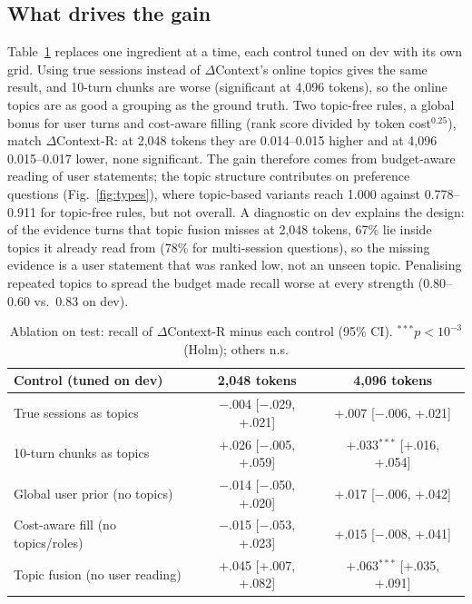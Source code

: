 \documentclass[conference]{IEEEtran}
\newcommand{\dc}{$\Delta$Context}
\newcommand{\dcr}{$\Delta$Context-R}
\begin{document}
\subsection{What drives the gain}
Table~\ref{tab:controls} replaces one ingredient at a time, each control tuned on
dev with its own grid. Using true sessions instead of \dc{}'s online topics gives
the same result, and 10-turn chunks are worse (significant at 4,096 tokens), so
the online topics are as good a grouping as the ground truth. Two topic-free
rules, a global bonus for user turns and cost-aware filling (rank score divided
by token cost$^{0.25}$), match \dcr{}: at 2,048 tokens they are 0.014--0.015
higher and at 4,096 0.015--0.017 lower, none significant. The gain therefore comes from
budget-aware reading of user statements; the topic structure contributes on
preference questions (Fig.~\ref{fig:types}), where topic-based variants reach
1.000 against 0.778--0.911 for topic-free rules, but not overall. A diagnostic
on dev explains the design: of the evidence turns that topic fusion misses at
2,048 tokens, 67\% lie inside topics it already read from (78\% for
multi-session questions), so the missing evidence is a user statement that was
ranked low, not an unseen topic. Penalising repeated topics to spread the
budget made recall worse at every strength (0.80--0.60 vs.\ 0.83 on dev).

\begin{table}[t]
\centering
\caption{Ablation on test: recall of \dcr{} minus each control (95\% CI). $^{***}p<10^{-3}$ (Holm); others n.s.}
\label{tab:controls}
\scriptsize
\setlength{\tabcolsep}{2.5pt}
\begin{tabular}{@{}lcc@{}}
\toprule
Control (tuned on dev) & 2,048 tokens & 4,096 tokens \\
\midrule
True sessions as topics & $-$.004 [$-$.029, +.021] & +.007 [$-$.006, +.021] \\
10-turn chunks as topics & +.026 [$-$.005, +.059] & +.033$^{***}$ [+.016, +.054] \\
Global user prior (no topics) & $-$.014 [$-$.050, +.020] & +.017 [$-$.006, +.042] \\
Cost-aware fill (no topics/roles) & $-$.015 [$-$.053, +.023] & +.015 [$-$.008, +.041] \\
Topic fusion (no user reading) & +.045 [+.007, +.082] & +.063$^{***}$ [+.035, +.091] \\
\bottomrule
\end{tabular}
\end{table}
\end{document}
